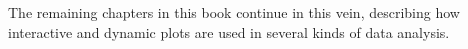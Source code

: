 
The remaining chapters in this book continue in this vein, describing
how interactive and dynamic plots are used in several kinds of data
analysis.





